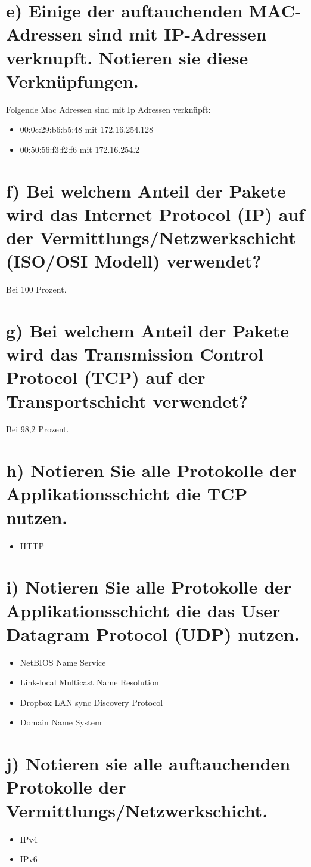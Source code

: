 \documentclass[a4paper, 11pt, fleqn, notitlepage, egregdoesnotlikesansseriftitles]{scrartcl}
\begin{document}
\section{e) Einige der auftauchenden MAC-Adressen sind mit IP-Adressen verknupft. Notieren sie diese Verknüpfungen.}

Folgende Mac Adressen sind mit Ip Adressen verknüpft:
\begin{itemize}
    \item 00:0c:29:b6:b5:48 mit 172.16.254.128
    \item 00:50:56:f3:f2:f6 mit 172.16.254.2
\end{itemize}

\section{f) Bei welchem Anteil der Pakete wird das Internet Protocol (IP) auf der Vermittlungs/Netzwerkschicht (ISO/OSI Modell) verwendet?}
Bei 100 Prozent.

\section{g) Bei welchem Anteil der Pakete wird das Transmission Control Protocol (TCP) auf der Transportschicht verwendet?}
Bei 98,2 Prozent.

\section{h) Notieren Sie alle Protokolle der Applikationsschicht die TCP nutzen.}
\begin{itemize}
    \item HTTP
\end{itemize}

\section{i) Notieren Sie alle Protokolle der Applikationsschicht die das User Datagram Protocol (UDP) nutzen.}
\begin{itemize}
    \item NetBIOS Name Service
    \item Link-local Multicast Name Resolution
    \item Dropbox LAN sync Discovery Protocol
    \item Domain Name System
\end{itemize}

\section{j) Notieren sie alle auftauchenden Protokolle der Vermittlungs/Netzwerkschicht.}
\begin{itemize}
    \item IPv4
    \item IPv6
\end{itemize}
\end{document}
